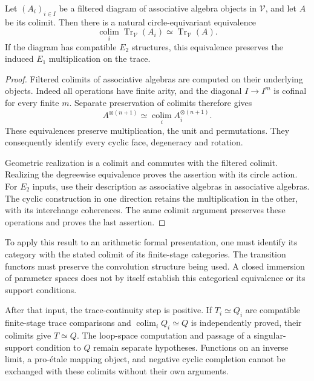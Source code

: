 \begin{proposition}
\label{v4-arith:traces:filtered-continuity}
Let $(A_i)_{i\in I}$ be a filtered diagram of associative algebra objects in
$\mathcal V$, and let $A$ be its colimit. Then there is a natural
circle-equivariant equivalence
\[
 \operatorname*{colim}_i\operatorname{Tr}_{\mathcal V}(A_i)
       \simeq\operatorname{Tr}_{\mathcal V}(A).
\]
If the diagram has compatible $E_2$ structures, this equivalence preserves
the induced $E_1$ multiplication on the trace.
\end{proposition}
\begin{proof}
Filtered colimits of associative algebras are computed on their underlying
objects. Indeed all operations have finite arity, and the diagonal $I\to
I^m$ is cofinal for every finite $m$. Separate preservation of colimits
therefore gives
\[
 A^{\otimes(n+1)}
   \simeq\operatorname*{colim}_i A_i^{\otimes(n+1)}.
\]
These equivalences preserve multiplication, the unit and permutations. They
consequently identify every cyclic face, degeneracy and rotation.

Geometric realization is a colimit and commutes with the filtered colimit.
Realizing the degreewise equivalence proves the assertion with its circle
action. For $E_2$ inputs, use their description as associative algebras in
associative algebras. The cyclic construction in one direction retains the
multiplication in the other, with its interchange coherences. The same
colimit argument preserves these operations and proves the last assertion.
\end{proof}

To apply this result to an arithmetic formal presentation, one must identify
its category with the stated colimit of its finite-stage categories. The
transition functors must preserve the convolution structure being used. A
closed immersion of parameter spaces does not by itself establish this
categorical equivalence or its support conditions.

After that input, the trace-continuity step is positive. If $T_i\simeq Q_i$
are compatible finite-stage trace comparisons and
$\operatorname*{colim}_iQ_i\simeq Q$ is independently proved, their colimits
give $T\simeq Q$. The loop-space computation and passage of a
singular-support condition to $Q$ remain separate hypotheses. Functions on
an inverse limit, a pro-\'etale mapping object, and negative cyclic
completion cannot be exchanged with these colimits without their own
arguments.

